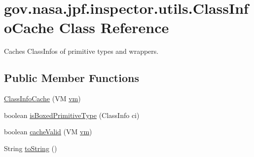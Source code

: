 \hypertarget{classgov_1_1nasa_1_1jpf_1_1inspector_1_1utils_1_1_class_info_cache}{}\section{gov.\+nasa.\+jpf.\+inspector.\+utils.\+Class\+Info\+Cache Class Reference}
\label{classgov_1_1nasa_1_1jpf_1_1inspector_1_1utils_1_1_class_info_cache}


Caches Class\+Infos of primitive types and wrappers.  


\subsection*{Public Member Functions}
\begin{DoxyCompactItemize}
\item 
\hyperlink{classgov_1_1nasa_1_1jpf_1_1inspector_1_1utils_1_1_class_info_cache_afccafb69fe07c112b62f735111309abb}{Class\+Info\+Cache} (VM \hyperlink{classgov_1_1nasa_1_1jpf_1_1inspector_1_1utils_1_1_class_info_cache_a4d8d22b70b147daca18b19bff668882b}{vm})
\item 
boolean \hyperlink{classgov_1_1nasa_1_1jpf_1_1inspector_1_1utils_1_1_class_info_cache_acfc346af97145709152a5d64eacb2828}{is\+Boxed\+Primitive\+Type} (Class\+Info ci)
\item 
boolean \hyperlink{classgov_1_1nasa_1_1jpf_1_1inspector_1_1utils_1_1_class_info_cache_ac71fb1624b72457166c1326d44fb50c5}{cache\+Valid} (VM \hyperlink{classgov_1_1nasa_1_1jpf_1_1inspector_1_1utils_1_1_class_info_cache_a4d8d22b70b147daca18b19bff668882b}{vm})
\item 
String \hyperlink{classgov_1_1nasa_1_1jpf_1_1inspector_1_1utils_1_1_class_info_cache_a9e893071a1ad27387cfbf1a33cbb96cf}{to\+String} ()
\end{DoxyCompactItemize}
